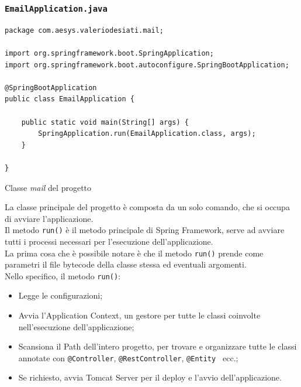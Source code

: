 \subsubsection{\texttt{EmailApplication.java}}
\begin{algorithm}
\centering
\begin{verbatim}
package com.aesys.valeriodesiati.mail;

import org.springframework.boot.SpringApplication;
import org.springframework.boot.autoconfigure.SpringBootApplication;

@SpringBootApplication
public class EmailApplication {
    
    public static void main(String[] args) {
        SpringApplication.run(EmailApplication.class, args);
    }

}
\end{verbatim}
\caption{Classe \emph{mail} del progetto}\label{alg:emailapplication}
\end{algorithm}

La classe principale del progetto è composta da un solo comando, che si occupa di avviare l'applicazione.\\
Il metodo \texttt{run()} è il metodo principale di Spring Framework, serve ad avviare tutti i processi necessari per l'esecuzione dell'applicazione.\\
La prima cosa che è possibile notare è che il metodo \texttt{run()} prende come parametri il file bytecode della classe stessa ed eventuali argomenti.\\
Nello specifico, il metodo \texttt{run()}:
\begin{itemize}
\item Legge le configurazioni;
\item Avvia l'Application Context, un gestore per tutte le classi coinvolte nell'esecuzione dell'applicazione;
\item Scansiona il Path dell'intero progetto, per trovare e organizzare tutte le classi annotate con \texttt{@Controller}, \texttt{@RestController}, \texttt{@Entity } ecc.;
\item Se richiesto, avvia Tomcat Server per il deploy e l'avvio dell'applicazione.
\end{itemize}
\newpage
